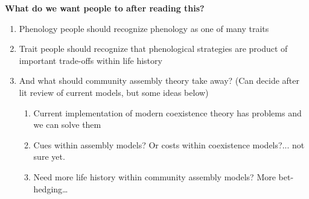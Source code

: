 \documentclass[11pt]{article}
\begin{document}


{\bf What do we want people to after reading this?} 
\begin{enumerate}
\item Phenology people should recognize phenology as one of many traits
\item Trait people should recognize that phenological strategies are product of important trade-offs within life history
\item And what should community assembly theory take away? (Can decide after lit review of current models, but some ideas below)
\begin{enumerate}
\item Current implementation of modern coexistence theory has problems and we can solve them %
\item Cues within assembly models? Or costs within coexistence models?... not sure yet. 
\item Need more life history within community assembly models? More bet-hedging… 
\end{enumerate}
\end{enumerate}
\end{document}
